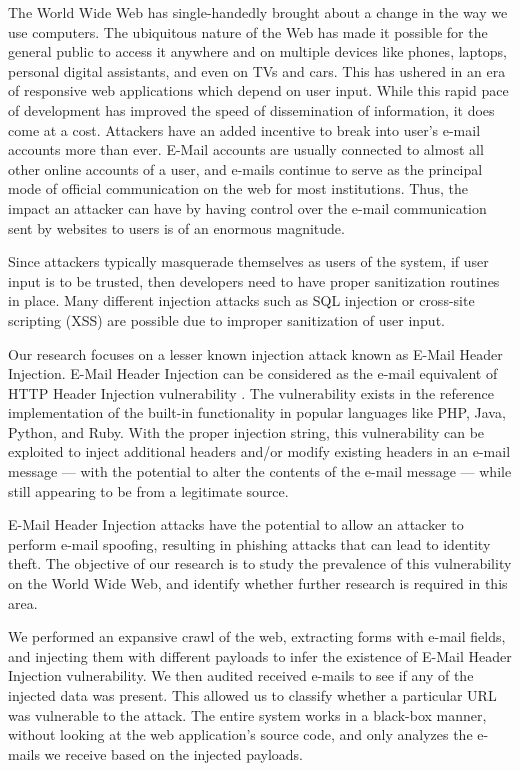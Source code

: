 	The World Wide Web has single-handedly brought about a change in the way we use computers. The ubiquitous nature of the Web has made it possible for the general public to access it anywhere and on multiple devices like phones, laptops, personal digital assistants, and even on TVs and cars. This has ushered in an era of responsive web applications which depend on user input. While this rapid pace of development has improved the speed of dissemination of information, it does come at a cost. Attackers have an added incentive to break into user's e-mail accounts more than ever. E-Mail accounts are usually connected to almost all other online accounts of a user, and e-mails continue to serve as the principal mode of official communication on the web for most institutions. Thus, the impact an attacker can have by having control over the e-mail communication sent by websites to users is of an enormous magnitude. 
	
	Since attackers typically masquerade themselves as users of the system, if user input is to be trusted, then developers need to have proper sanitization routines in place. Many different injection attacks such as SQL injection or cross-site scripting (XSS) \cite{OWASPT10} are possible due to improper sanitization of user input. 
	
	Our research focuses on a lesser known injection attack known as E-Mail Header Injection. E-Mail Header Injection can be considered as the e-mail equivalent of HTTP Header Injection vulnerability \cite{wiki:HTTP_headerinjection}. The vulnerability exists in the reference implementation of the built-in  functionality in popular languages like PHP, Java, Python, and Ruby. With the proper injection string, this vulnerability can be exploited to inject additional headers and/or modify existing headers in an e-mail message --- with the potential to alter the contents of the e-mail message --- while still appearing to be from a legitimate source.
	
	E-Mail Header Injection attacks have the potential to allow an attacker to perform e-mail spoofing, resulting in phishing attacks that can lead to identity theft.
	The objective of our research is to study the prevalence of this vulnerability on the World Wide Web, and identify whether further research is required in this area.
	
	We performed an expansive crawl of the web, extracting forms with e-mail fields, and injecting them with different payloads to infer the existence of E-Mail Header Injection vulnerability. We then audited received e-mails to see if any of the injected data was present. This allowed us to classify whether a particular URL was vulnerable to the attack. The entire system works in a black-box manner, without looking at the web application's source code, and only analyzes the e-mails we receive based on the injected payloads.

